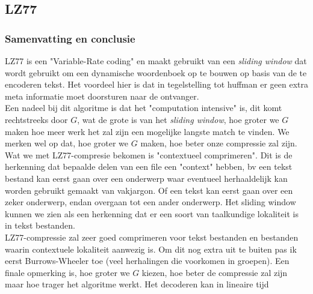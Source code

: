 \documentclass[10pt,a4paper]{report}
\begin{document}
\subsection*{LZ77}
\subsubsection*{Samenvatting en conclusie}
LZ77 is een "Variable-Rate coding" en  maakt gebruikt van een \emph{sliding window} dat wordt gebruikt om een dynamische woordenboek op te bouwen op basis van de te encoderen tekst. Het voordeel hier is dat in tegelstelling tot huffman er geen extra meta informatie moet doorsturen naar de ontvanger.\\

Een nadeel bij dit algoritme is dat het "computation intensive" is, dit komt rechtstreeks door $G$, wat de grote is van het \emph{sliding window}, hoe groter we $G$ maken hoe meer werk het zal zijn een mogelijke langste match te vinden. We merken wel op dat, hoe groter we $G$ maken, hoe beter onze compressie zal zijn.\\

Wat we met LZ77-compresie bekomen is "contextueel comprimeren". Dit is de herkenning dat bepaalde delen van een file een "context" hebben, bv een tekst bestand kan eerst gaan over een onderwerp waar eventueel herhaaldelijk	kan worden gebruikt gemaakt van vakjargon. Of een tekst kan eerst gaan over een zeker onderwerp, endan overgaan tot een ander onderwerp. Het sliding window kunnen we zien als een herkenning dat er een soort van taalkundige lokaliteit is in tekst bestanden.\\

LZ77-compressie zal zeer goed comprimeren voor tekst bestanden en bestanden waarin contextuele lokaliteit aanwezig is. Om dit nog extra uit te buiten pas ik eerst Burrows-Wheeler toe (veel herhalingen die voorkomen in groepen). Een finale opmerking is, hoe groter we $G$ kiezen, hoe beter de compressie zal zijn maar hoe trager het algoritme werkt. Het decoderen kan in lineaire tijd\\
\end{document}
